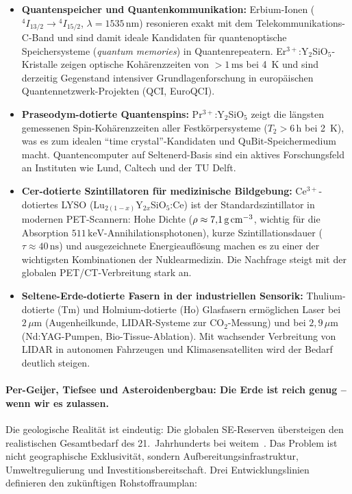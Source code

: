 ﻿\documentclass[12pt, a4paper]{report}
\theoremstyle{definition}
\theoremstyle{remark}
\begin{document}
\begin{itemize}
  \item \textbf{Quantenspeicher und Quantenkommunikation:}
    Erbium-Ionen ($^4I_{13/2} \to {^4I_{15/2}}$, $\lambda = 1535\,\text{nm}$)
    resonieren exakt mit dem Telekommunikations-C-Band und sind damit ideale
    Kandidaten für quantenoptische Speichersysteme (\emph{quantum memories})
    in Quantenrepeatern. Er$^{3+}$:Y$_2$SiO$_5$-Kristalle zeigen optische
    Kohärenzzeiten von $>1\,\text{ms}$ bei 4~K und sind derzeitig Gegenstand
    intensiver Grundlagenforschung in europäischen Quantennetzwerk-Projekten
    (QCI, EuroQCI).

  \item \textbf{Praseodym-dotierte Quantenspins:}
    Pr$^{3+}$:Y$_2$SiO$_5$ zeigt die längsten gemessenen Spin-Kohärenzzeiten
    aller Festkörpersysteme ($T_2 > 6\,\text{h}$ bei 2~K), was es zum
    idealen ``time crystal''-Kandidaten und $\mathrm{QuBit}$-Speichermedium
    macht. Quantencomputer auf Seltenerd-Basis sind ein aktives Forschungsfeld
    an Instituten wie Lund, Caltech und der TU Delft.

  \item \textbf{Cer-dotierte Szintillatoren für medizinische Bildgebung:}
    Ce$^{3+}$-dotiertes LYSO (Lu$_{2(1-x)}$Y$_{2x}$SiO$_5$:Ce) ist der
    Standardszintillator in modernen PET-Scannern: Hohe Dichte
    ($\rho \approx 7{,}1\,\text{g\,cm}^{-3}$, wichtig für die Absorption
    $511\,\text{keV}$-Annihilationsphotonen), kurze Szintillationsdauer
    ($\tau \approx 40\,\text{ns}$) und ausgezeichnete Energieauflösung machen
    es zu einer der wichtigsten Kombinationen der Nuklearmedizin. Die Nachfrage
    steigt mit der globalen PET/CT-Verbreitung stark an.

  \item \textbf{Seltene-Erde-dotierte Fasern in der industriellen Sensorik:}
    Thulium-dotierte (Tm) und Holmium-dotierte (Ho) Glasfasern ermöglichen
    Laser bei $2\,\mu\text{m}$ (Augenheilkunde, LIDAR-Systeme zur
    CO$_2$-Messung) und bei $2{,}9\,\mu\text{m}$ (Nd:YAG-Pumpen,
    Bio-Tissue-Ablation). Mit wachsender Verbreitung von LIDAR in
    autonomen Fahrzeugen und Klimasensatelliten wird der Bedarf deutlich
    steigen.
\end{itemize}

\paragraph{Per-Geijer, Tiefsee und Asteroidenbergbau: Die Erde ist
reich genug -- wenn wir es zulassen.}
Die geologische Realität ist eindeutig: Die globalen SE-Reserven übersteigen
den realistischen Gesamtbedarf des 21.~Jahrhunderts bei weitem~\cite{usgs2024}.
Das Problem ist nicht geographische Exklusivität, sondern Aufbereitungsinfrastruktur,
Umweltregulierung und Investitionsbereitschaft. Drei Entwicklungslinien
definieren den zukünftigen Rohstoffraumplan:
\end{document}
